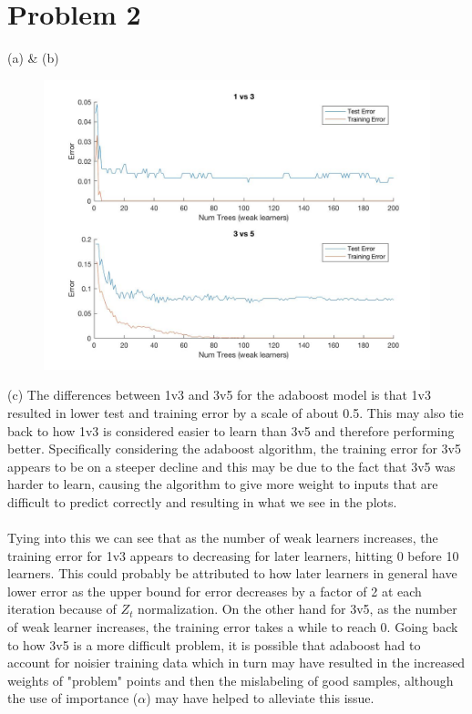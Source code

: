 \documentclass[12pt,letterpaper]{article}
\begin{document}
\section*{Problem 2}
\begin{description}
	\item (a) \& (b)
\begin{figure}[H]
\includegraphics[scale=0.4]{image2.jpg} 
\end{figure}
\item (c) The differences between 1v3 and 3v5 for the adaboost model is that 1v3 resulted in lower test and training error by a scale of about 0.5.  This may also tie back to how 1v3 is considered easier to learn than 3v5 and therefore performing better. Specifically considering the adaboost algorithm, the training error for 3v5 appears to be on a steeper decline and this may be due to the fact that 3v5 was harder to learn, causing the algorithm to give more weight to inputs that are difficult to predict correctly and resulting in what we see in the plots. 
\\\\Tying into this we can see that as the number of weak learners increases, the training error for 1v3 appears to decreasing for later learners, hitting 0 before 10 learners. This could probably be attributed to how later learners in general have lower error as the upper bound for error decreases by a factor of 2 at each iteration because of $Z_t$ normalization. On the other hand for 3v5, as the number of weak learner increases, the training error takes a while to reach 0. Going back to how 3v5 is a more difficult problem, it is possible that adaboost had to account for noisier training data which in turn may have resulted in the increased weights of "problem" points and then the mislabeling of good samples, although the use of importance ($\alpha$) may have helped to alleviate this issue.

\end{description}
\end{document}
